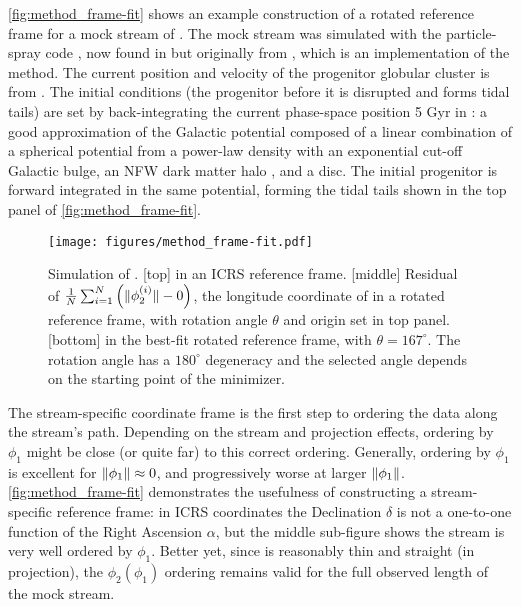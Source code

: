 \documentclass[fleqn,usenatbib]{mnras}
\begin{document}
    \autoref{fig:method_frame-fit} shows an example construction of a rotated
    reference frame for a mock stream of  \citep{El-Falou2022}.
    The mock stream was simulated with the particle-spray code
    \galpystreamspraydf{} \citep{Qian2022}, now found in \galpy{}
    \citep{Bovy2015} but originally from 
    \citep{Banik2009}, which is an implementation of the \citet{Fardal2015}
    method. The current position and velocity of the progenitor globular cluster
    is from \citet{Vasiliev2019}. The initial conditions (the progenitor before
    it is disrupted and forms tidal tails) are set by back-integrating the
    current phase-space position 5 Gyr in \galpyMWPotential{} \citep{Bovy2015}:
    a good approximation of the Galactic potential \citep{Bovy2016cx} composed
    of a linear combination of a spherical potential from a power-law density
    with an exponential cut-off Galactic bulge, an NFW dark matter halo
    \citep{NFW1996}, and a \citet{Miyamoto1975} disc. The initial progenitor is
    forward integrated in the same potential, forming the tidal tails shown in
    the top panel of \autoref{fig:method_frame-fit}.
    \begin{figure}
      \centering
      \texttt{[image: figures/method\_frame-fit.pdf]}
      \caption{ Simulation of  \citep{El-Falou2022}.
        [top]  in an ICRS reference frame.
        [middle] Residual of
        $\frac{1}{N}\sum_{i=1}^{N}\left({\lVert \phi_2^{(i)} \rVert - 0}\right)$, the
        longitude coordinate of  in a rotated reference frame,
        with rotation angle $\theta$ and origin set in top panel.
        [bottom]  in the best-fit rotated reference frame, with
        $\theta = 167^\circ$. The rotation angle has a $180^\circ$ degeneracy
        and the selected angle depends on the starting point of the minimizer. }
      \label{fig:method_frame-fit}
    \end{figure}
    The stream-specific coordinate frame is the first step to ordering the data
    along the stream's path. Depending on the stream and projection effects,
    ordering by $\phi_1$ might be close (or quite far) to this correct ordering.
    Generally, ordering by $\phi_1$ is excellent for $\lVert \phi_1 \rVert \approx 0$,
    and progressively worse at larger $\lVert \phi_1 \rVert$.
    \autoref{fig:method_frame-fit} demonstrates the usefulness of constructing a
    stream-specific reference frame: in ICRS coordinates the Declination
    $\delta$ is not a one-to-one function of the Right Ascension $\alpha$, but
    the middle sub-figure shows the stream is very well ordered by $\phi_1$.
    Better yet, since  is reasonably thin and straight (in
    projection), the $\phi_2(\phi_1)$ ordering remains valid for the full
    observed length of the  mock stream.
\end{document}
